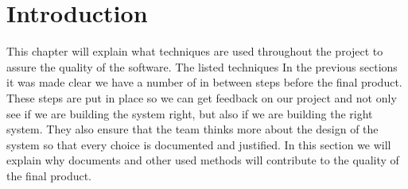 \section{Introduction}
This chapter will explain what techniques are used throughout the project to assure the quality of the software. The listed techniques 
In the previous sections it was made clear we have a number of in between steps before the final product. These steps are put in place so we can get feedback on our project  and not only see if we are building the system right, but also if we are building the right system. They also ensure that the team thinks more about the design of the system so that every choice is documented and justified. In this section we will explain why documents and other used methods will contribute to the quality of the final product.
